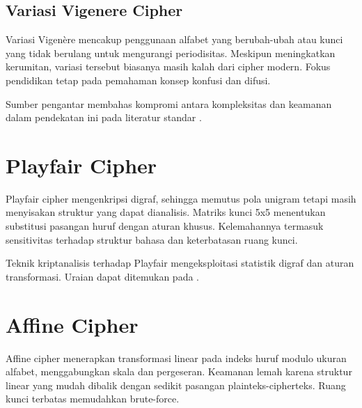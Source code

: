 \documentclass[../main.tex]{subfiles}
\begin{document}
\begin{table}[h]
\centering
\caption{Perbandingan ringkas beberapa cipher klasik}
\label{tab:klasik}
\end{table}

\subsection{Variasi Vigenere Cipher}
Variasi Vigenère mencakup penggunaan alfabet yang berubah-ubah atau kunci yang tidak berulang untuk mengurangi periodisitas. Meskipun meningkatkan kerumitan, variasi tersebut biasanya masih kalah dari cipher modern. Fokus pendidikan tetap pada pemahaman konsep konfusi dan difusi.

Sumber pengantar membahas kompromi antara kompleksitas dan keamanan dalam pendekatan ini pada literatur standar \parencite{menezes1996handbook}.

\section{Playfair Cipher}
Playfair cipher mengenkripsi digraf, sehingga memutus pola unigram tetapi masih menyisakan struktur yang dapat dianalisis. Matriks kunci 5x5 menentukan substitusi pasangan huruf dengan aturan khusus. Kelemahannya termasuk sensitivitas terhadap struktur bahasa dan keterbatasan ruang kunci.

Teknik kriptanalisis terhadap Playfair mengeksploitasi statistik digraf dan aturan transformasi. Uraian dapat ditemukan pada \textcite{menezes1996handbook}.

\section{Affine Cipher}
Affine cipher menerapkan transformasi linear pada indeks huruf modulo ukuran alfabet, menggabungkan skala dan pergeseran. Keamanan lemah karena struktur linear yang mudah dibalik dengan sedikit pasangan plainteks-cipherteks. Ruang kunci terbatas memudahkan brute-force.
\end{document}
